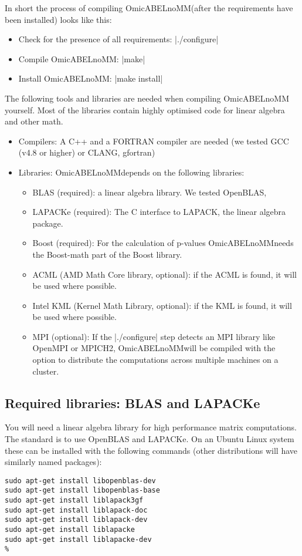 \documentclass{report}
\newcommand{\oanomm}{OmicABELnoMM}
\begin{document}
In short the process of compiling \oanomm (after the requirements have
been installed) looks like this:
\begin{itemize}
\item Check for the presence of all requirements: |./configure|
\item Compile \oanomm: |make|
\item Install \oanomm: |make install|
\end{itemize}

The following tools and libraries are needed when compiling \oanomm
yourself. Most of the libraries contain highly optimised code for
linear algebra and other math.
\begin{itemize}
\item Compilers: A C++ and a FORTRAN compiler are needed (we tested
  GCC (v4.8 or higher) or CLANG, gfortran)
\item Libraries: \oanomm depends on the following libraries:
  \begin{itemize}
  \item \acs{BLAS} (required): a linear algebra library. We tested OpenBLAS,
  \item LAPACKe (required): The C interface to LAPACK, the linear
    algebra package.
  \item Boost (required): For the calculation of p-values \oanomm needs the
    Boost-math part of the Boost library.
  \item ACML (AMD Math Core library, optional): if the ACML is found,
    it will be used where possible.
  \item Intel KML (Kernel Math Library, optional): if the KML is
    found, it will be used where possible.
  \item \acs{MPI} (optional): If the |./configure| step detects an
    \acf{MPI} library like OpenMPI or MPICH2, \oanomm will be compiled
    with the option to distribute the computations across multiple
    machines on a cluster.
  \end{itemize}
\end{itemize}


\subsection{Required libraries: \ac{BLAS} and LAPACKe}
You will need a linear algebra library for high performance matrix
computations.  The standard is to use OpenBLAS and LAPACKe. On an
Ubuntu Linux system these can be installed with the following commands
(other distributions will have similarly named packages):
\begin{lstlisting}[escapechar=\%]
sudo apt-get install libopenblas-dev
sudo apt-get install libopenblas-base
sudo apt-get install liblapack3gf
sudo apt-get install liblapack-doc
sudo apt-get install liblapack-dev
sudo apt-get install liblapacke
sudo apt-get install liblapacke-dev
%
\end{lstlisting}
\end{document}
